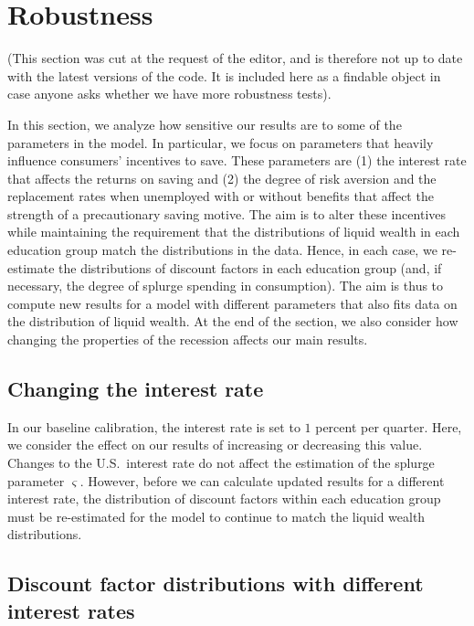 \documentclass[\latexroot/\projectname]{subfiles}
\begin{document}
\FloatBarrier
\hypertarget{robustness}{}

\section*{Robustness}
\whenintegrated{\label{sec:robustness}} 

(This section was cut at the request of the editor, and is therefore not up to date with the latest versions of the code.  It is included here as a findable object in case anyone asks whether we have more robustness tests).

In this section, we analyze how sensitive our results are to some of the parameters in the model. In particular, we focus on parameters that heavily influence consumers' incentives to save. These parameters are (1) the interest rate that affects the returns on saving and (2) the degree of risk aversion and the replacement rates when unemployed with or without benefits that affect the strength of a precautionary saving motive. The aim is to alter these incentives while maintaining the requirement that the distributions of liquid wealth in each education group match the distributions in the data. Hence, in each case, we re-estimate the distributions of discount factors in each education group (and, if necessary, the degree of splurge spending in consumption). The aim is thus to compute new results for a model with different parameters that also fits data on the distribution of liquid wealth. At the end of the section, we also consider how changing the properties of the recession affects our main results.

\hypertarget{changing-the-interest-rate}{}\par\subsection*{Changing the interest rate}
\whenintegrated{\label{sec:robust_R}} 
In our baseline calibration, the interest rate is set to $1$ percent per quarter. Here, we consider the effect on our results of increasing or decreasing this value. Changes to the U.S.\ interest rate do not affect the estimation of the splurge parameter $\varsigma$. However, before we can calculate updated results for a different interest rate, the distribution of discount factors within each education group must be re-estimated for the model to continue to match the liquid wealth distributions.

\subsection*{Discount factor distributions with different interest rates}
\whenintegrated{\label{sec:robust_R_estim}} 
\end{document}
